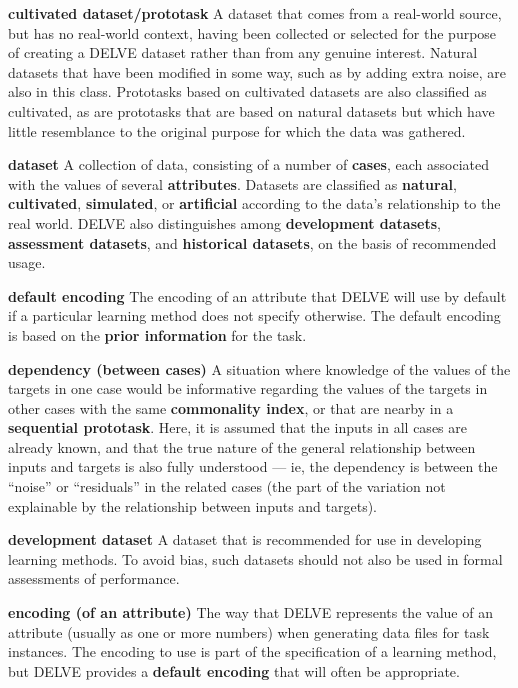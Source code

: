 \begin{list}{}{%
\setlength{\itemsep}{0in}%
\setlength{\leftmargin}{2.25in}%
\setlength{\labelsep}{0in}%
\setlength{\labelwidth}{2.25in}}
\item[\bf cultivated dataset/prototask \hfill]
A dataset that comes from a real-world source, but has no real-world
context, having been collected or selected for the purpose of 
creating a DELVE dataset rather than from any genuine interest.  Natural
datasets that have been modified in some way, such as by adding extra
noise, are also in this class.  Prototasks based on cultivated datasets are 
also classified as cultivated, as are prototasks that are based on natural 
datasets but which have little resemblance to the original purpose for 
which the data was gathered.

\item[\bf dataset \hfill] 
A collection of data, consisting of a number of {\bf cases}, each
associated with the values of several {\bf attributes}.  Datasets are
classified as {\bf natural}, {\bf cultivated}, {\bf simulated}, or
{\bf artificial} according to the data's relationship to the real
world.  DELVE also distinguishes among {\bf development datasets},
{\bf assessment datasets}, and {\bf historical datasets}, on the basis
of recommended usage.

\item[\bf default encoding \hfill]
The encoding of an attribute that DELVE will use by default
if a particular learning method does not specify otherwise.
The default encoding is based on the {\bf prior information}
for the task.

\item[\bf dependency (between cases) \hfill]
A situation where knowledge of the values of the targets in one case
would be informative regarding the values of the targets in other
cases with the same {\bf commonality index}, or that are nearby in a
{\bf sequential prototask}.  Here, it is assumed that the inputs in all cases
are already known, and that the true nature of the general relationship 
between inputs and targets is also fully understood --- ie, the dependency 
is between the ``noise'' or ``residuals'' in the related cases (the
part of the variation not explainable by the relationship between inputs
and targets).

\item[\bf development dataset \hfill]
A dataset that is recommended for use in developing learning methods.
To avoid bias, such datasets should not also be used in formal assessments
of performance.

\item[\bf encoding (of an attribute) \hfill]
The way that DELVE represents the value of an attribute (usually as one or
more numbers) when generating data files for task instances.  The 
encoding to use is part of the specification
of a learning method, but DELVE provides a 
{\bf default encoding} that will often be appropriate.


\end{list}
